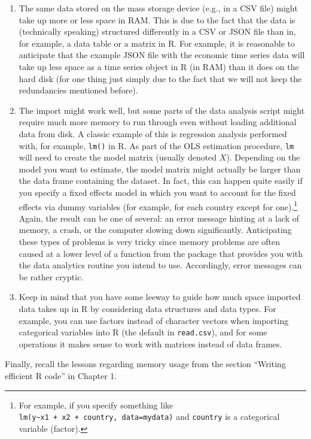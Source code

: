 \documentclass[
  12pt,
]{style/krantz}
\begin{document}
\begin{enumerate}
\def\labelenumi{\arabic{enumi}.}
\item
  The same data stored on the mass storage device (e.g., in a CSV file) might take up more or less space in RAM. This is due to the fact that the data is (technically speaking) structured differently in a CSV or JSON file than in, for example, a data table or a matrix in R. For example, it is reasonable to anticipate that the example JSON file with the economic time series data will take up less space as a time series object in R (in RAM) than it does on the hard disk (for one thing just simply due to the fact that we will not keep the redundancies mentioned before).
\item
  The import might work well, but some parts of the data analysis script might require much more memory to run through even without loading additional data from disk. A classic example of this is regression analysis performed with, for example, \texttt{lm()} in R. As part of the OLS estimation procedure, \texttt{lm} will need to create the model matrix (usually denoted \(X\)). Depending on the model you want to estimate, the model matrix might actually be larger than the data frame containing the dataset. In fact, this can happen quite easily if you specify a fixed effects model in which you want to account for the fixed effects via dummy variables (for example, for each country except for one).\footnote{For example, if you specify something like \texttt{lm(y\textasciitilde{}x1\ +\ x2\ +\ country,\ data=mydata)} and \texttt{country} is a categorical variable (factor).} Again, the result can be one of several: an error message hinting at a lack of memory, a crash, or the computer slowing down significantly. Anticipating these types of problems is very tricky since memory problems are often caused at a lower level of a function from the package that provides you with the data analytics routine you intend to use. Accordingly, error messages can be rather cryptic.
\item
  Keep in mind that you have some leeway to guide how much space imported data takes up in R by considering data structures and data types. For example, you can use factors instead of character vectors when importing categorical variables into R (the default in \texttt{read.csv}), and for some operations it makes sense to work with matrices instead of data frames.
\end{enumerate}

Finally, recall the lessons regarding memory usage from the section ``Writing efficient R code'' in Chapter 1.
\end{document}
